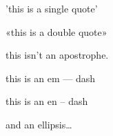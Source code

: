 
\def\mytitle{MultiMarkdown French Test}

'this is a single quote'

«this is a double quote»

this isn't an apostrophe.

this is an em --- dash

this is an en -- dash

and an ellipsis{\ldots}




